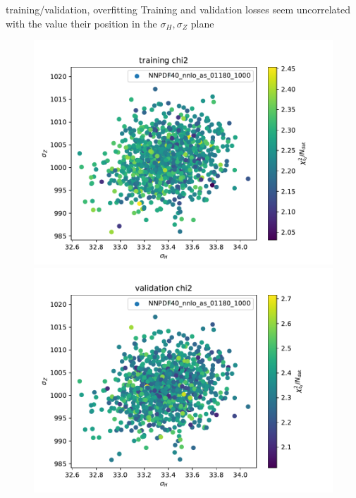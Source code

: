 \documentclass[aspectratio=169,10pt]{beamer}
\begin{document}
\begin{frame}[t]{training/validation, overfitting}
  Training and validation losses seem uncorrelated with the value their position in the $\sigma_H,\sigma_Z$ plane
  \begin{figure}
    \centering
    \includegraphics[height=.55\textheight]{chi2_training_chi2.pdf}
    \includegraphics[height=.55\textheight]{chi2_validation_chi2.pdf}
  \end{figure}
\end{frame}
\end{document}

